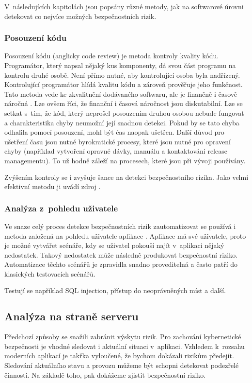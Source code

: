 \documentclass[thesis=M,czech]{FITthesis}[2012/10/20]
\begin{document}
			V~následujících kapitolách jsou popsány různé metody, jak na softwarové úrovni detekovat co nejvíce možných bezpečnostních rizik.
			
			\subsubsection{Posouzení kódu}
				Posouzení kódu (anglicky code review) je metoda kontroly kvality kódu. Programátor, který napsal nějaký kus komponenty, dá svou část programu na kontrolu druhé osobě. Není přímo nutné, aby kontrolující osoba byla nadřízený. Kontrolující programátor hlídá kvalitu kódu a zároveň prověřuje jeho funkčnost. Tato metoda vede ke zkvalitnění dodávaného softwaru, ale je finančně i časově náročná \cite{code-rew}. Lze ovšem říci, že finanční i časová náročnost jsou diskutabilní. Lze se setkat s~tím, že kód, který neprošel posouzením druhou osobou nebude fungovat a charakteristika chyby neumožní její snadnou detekci. Pokud by se tato chyba odhalila pomocí posouzení, mohl být čas naopak ušetřen. Další důvod pro ušetření času jsou nutné byrokratické procesy, které jsou nutné pro opravení chyby (například vytvoření opravné dávky, manuálu a kontaktování release managementu). To už hodně záleží na procesech, které jsou při vývoji používány. 
			
			Zvýšením kontroly se i zvyšuje šance na detekci bezpečnostního rizika. Jako velmi efektivní metodu ji uvádí zdroj \cite{pethukovKozlovVulnerabilities}.
			
			\subsubsection{Analýza z~pohledu uživatele}
				Ve snaze celý proces detekce bezpečnostních rizik zautomatizovat se používá i metoda založená na pohledu uživatele aplikace \cite{pethukovKozlovVulnerabilities}. Aplikace má své uživatele, proto je možné vytvářet scénáře, kdy se uživatel pokouší najít v~aplikaci nějaký nedostatek. Takový nedostatek může následně produkovat bezpečnostní riziko. Automatizace těchto scénářů je zpravidla snadno proveditelná a často patří do klasických testovacích scénářů.
				
				Testují se například SQL injection, přístup do neoprávněných míst a další.
				
			\subsection{Analýza na straně serveru}
				Předchozí způsoby se snažili zabránit výskytu rizik. Pro zachování kybernetické bezpečnosti je vhodné sledovat i aktuální situaci v~aplikaci. Vzhledem k~rozsahu moderních aplikací je takřka vyloučené, že bychom dokázali rizikům předejít. Sledování aktuálního stavu a provozu můžeme být schopni detekovat podezřelé činnosti. Na základě toho, pak dokážeme zjistit bezpečnostní riziko.
				
\end{document}
